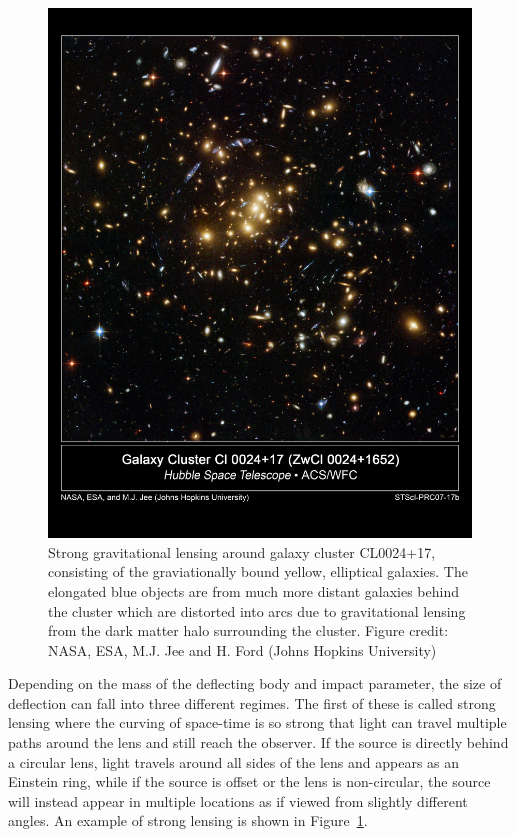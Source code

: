 \begin{figure}[htbp]
  \centering
  \includegraphics[width=\textwidth]{DarkMatter/Figures/strong_lensing.jpg}
  \caption{
    Strong gravitational lensing around galaxy cluster CL0024+17, consisting of the graviationally bound yellow, elliptical galaxies.
    The elongated blue objects are from much more distant galaxies behind the cluster which are distorted into arcs due to gravitational lensing from the dark matter halo surrounding the cluster.
    Figure credit:  NASA, ESA, M.J. Jee and H. Ford (Johns Hopkins University)
  }
  \label{fig:strong_lensing}
\end{figure}

Depending on the mass of the deflecting body and impact parameter, the size of deflection can fall into three different regimes.
The first of these is called strong lensing where the curving of space-time is so strong that light can travel multiple paths around the lens and still reach the observer.
If the source is directly behind a circular lens, light travels around all sides of the lens and appears as an Einstein ring, while if the source is offset or the lens is non-circular, the source will instead appear in multiple locations as if viewed from slightly different angles.
An example of strong lensing is shown in Figure~\ref{fig:strong_lensing}.

